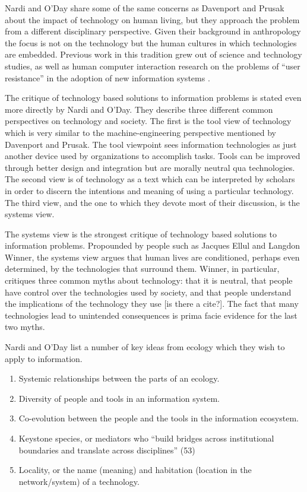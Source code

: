 Nardi and O'Day share some of the same concerns as Davenport and Prusak about the impact of technology on human living, but they approach the problem from a different disciplinary perspective. Given their background in anthropology the focus is not on the technology but the human cultures in which technologies are embedded. Previous work in this tradition grew out of science and technology studies, as well as human computer interaction research on the problems of ``user resistance'' in the adoption of new information systems \citep{star_1996}.

The critique of technology based solutions to information problems is stated even more directly by Nardi and O'Day. They describe three different common perspectives on technology and society. The first is the tool view of technology which is very similar to the machine-engineering perspective mentioned by Davenport and Prusak. The tool viewpoint sees information technologies as just another device used by organizations to accomplish tasks. Tools can be improved through better design and integration but are morally neutral qua technologies. The second view is of technology as a text which can be interpreted by scholars in order to discern the intentions and meaning of using a particular technology. The third view, and the one to which they devote most of their discussion, is the systems view.

The systems view is the strongest critique of technology based solutions to information problems. Propounded by people such as Jacques Ellul and Langdon Winner, the systems view argues that human lives are conditioned, perhaps even determined, by the technologies that surround them. Winner, in particular, critiques three common myths about technology: that it is neutral, that people have control over the technologies used by society, and that people understand the implications of the technology they use [is there a cite?]. The fact that many technologies lead to unintended consequences is prima facie evidence for the last two myths.

Nardi and O'Day list a number of key ideas from ecology which they wish to apply to information.

\begin{enumerate}
\item Systemic relationships between the parts of an ecology.
\item Diversity of people and tools in an information system.
\item Co-evolution between the people and the tools in the information ecosystem.
\item Keystone species, or mediators who ``build bridges across institutional boundaries and translate across disciplines'' (53)
\item Locality, or the name (meaning) and habitation (location in the network/system) of a technology.
\end{enumerate}

